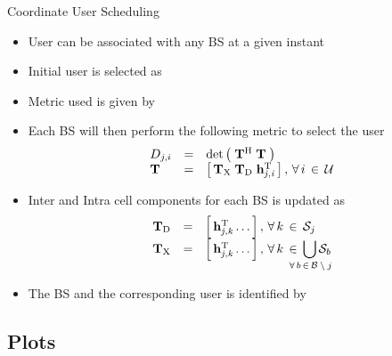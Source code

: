 \documentclass{beamer}
\begin{document}
\begin{frame}
\begin{block}{Coordinate User Scheduling}
\begin{itemize}
  \item User can be associated with any BS at a given instant
  \item Initial user is selected as 
  \item Metric used is given by 
  \item Each BS will then perform the following metric to select the user
  \begin{equation*}
  \begin{array}{lcl}
  D_{j,i} &=& \det \left ( \; \mathbf{T}^{\mathrm{H}} \; \mathbf{T} \; \right ) \\
  \mathbf{T} &=& \left [ \, \mathbf{T}_{\mathrm{X}} \; \mathbf{T}_{\mathrm{D}} \; \mathbf{h}_{\mathit{j},\mathit{i}}^{\mathrm{T}} \, \right ], \, \forall \, i \, \in \, \mathcal{U}
  \end{array}
  \end{equation*}
  \item Inter and Intra cell components for each BS is updated as
  \begin{equation*}
  \begin{array}{lcl}
  \mbf{T}_{\mrm{D}} &=& \matscont{\mvecxyz{h}{j}{k}^\mrm{T} \dotso}, \fall k \inm \mc{S}_j \\
  \mbf{T}_{\mrm{X}} &=& \matscont{\mvecxyz{h}{j}{k}^\mrm{T} \dotso }, \fall k \inm \displaystyle \bigcup_{\mathclap{\fall b \inm \mc{B} \bs j}} \mc{S}_b
  \end{array}
  \end{equation*}
  \item The BS and the corresponding user is identified by 
\end{itemize}
\end{block}
\end{frame}

\subsection{Plots}
\end{document}
